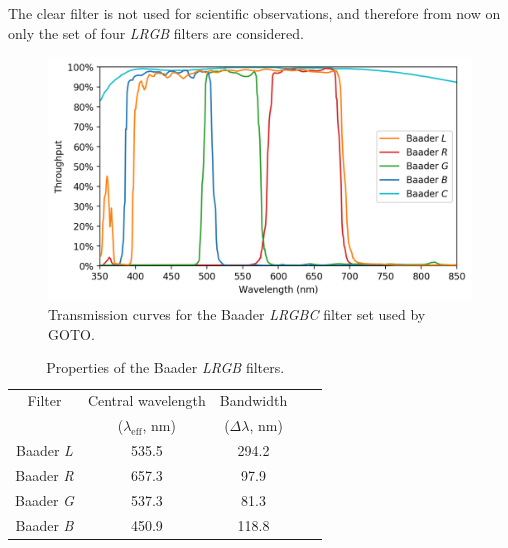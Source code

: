 \begin{colsection}
\begin{colsection}
The clear filter is not used for scientific observations, and therefore from now on only the set of four \textit{LRGB} filters are considered.

\begin{figure}[t]
    \begin{center}
        \includegraphics[width=\textwidth]{images/throughput/trans_filters.png}
    \end{center}
    \caption[Baader filter transmission curves]{
        Transmission curves for the Baader \textit{LRGBC} filter set used by GOTO.\
    }\label{fig:filters}
\end{figure}

\newpage

\begin{table}[t]
    \begin{center}
        \begin{tabular}{c|cccc} %
            Filter            & Central wavelength                          & Bandwidth            \\
                              & ($\lambda_\text{eff}$, nm) & ($\Delta\lambda$, nm) \\
            \midrule
            Baader \textit{L} & 535.5 & 294.2 \\
            Baader \textit{R} & 657.3 &  97.9 \\
            Baader \textit{G} & 537.3 &  81.3 \\
            Baader \textit{B} & 450.9 & 118.8 \\
        \end{tabular}
    \end{center}
    \caption[Baader filter properties]{
        Properties of the Baader \textit{LRGB} filters.
    }\label{tab:filters}
\end{table}


\end{colsection}
\end{colsection}
